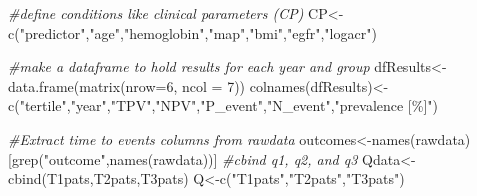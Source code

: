 \documentclass[
]{article}
\newenvironment{Shaded}{\begin{snugshade}}{\end{snugshade}}
\newcommand{\AttributeTok}[1]{\textcolor[rgb]{0.77,0.63,0.00}{#1}}
\newcommand{\CommentTok}[1]{\textcolor[rgb]{0.56,0.35,0.01}{\textit{#1}}}
\newcommand{\DecValTok}[1]{\textcolor[rgb]{0.00,0.00,0.81}{#1}}
\newcommand{\FunctionTok}[1]{\textcolor[rgb]{0.00,0.00,0.00}{#1}}
\newcommand{\NormalTok}[1]{#1}
\newcommand{\OtherTok}[1]{\textcolor[rgb]{0.56,0.35,0.01}{#1}}
\newcommand{\StringTok}[1]{\textcolor[rgb]{0.31,0.60,0.02}{#1}}
\begin{document}
\begin{Shaded}
\begin{Highlighting}[]
\CommentTok{\#define conditions like clinical parameters (CP) }
\NormalTok{CP}\OtherTok{\textless{}{-}}\FunctionTok{c}\NormalTok{(}\StringTok{"predictor"}\NormalTok{,}\StringTok{"age"}\NormalTok{,}\StringTok{"hemoglobin"}\NormalTok{,}\StringTok{"map"}\NormalTok{,}\StringTok{"bmi"}\NormalTok{,}\StringTok{"egfr"}\NormalTok{,}\StringTok{"logacr"}\NormalTok{)}

\CommentTok{\#make a dataframe to hold results for each year and group}
\NormalTok{dfResults}\OtherTok{\textless{}{-}}\FunctionTok{data.frame}\NormalTok{(}\FunctionTok{matrix}\NormalTok{(}\AttributeTok{nrow=}\DecValTok{6}\NormalTok{, }\AttributeTok{ncol =} \DecValTok{7}\NormalTok{))}
\FunctionTok{colnames}\NormalTok{(dfResults)}\OtherTok{\textless{}{-}}\FunctionTok{c}\NormalTok{(}\StringTok{"tertile"}\NormalTok{,}\StringTok{"year"}\NormalTok{,}\StringTok{"TPV"}\NormalTok{,}\StringTok{"NPV"}\NormalTok{,}\StringTok{"P\_event"}\NormalTok{,}\StringTok{"N\_event"}\NormalTok{,}\StringTok{"prevalence [\%]"}\NormalTok{)}


\CommentTok{\#Extract time to events columns from rawdata}
\NormalTok{outcomes}\OtherTok{\textless{}{-}}\FunctionTok{names}\NormalTok{(rawdata)[}\FunctionTok{grep}\NormalTok{(}\StringTok{"outcome"}\NormalTok{,}\FunctionTok{names}\NormalTok{(rawdata))]}
\CommentTok{\#cbind q1, q2, and q3}
\NormalTok{Qdata}\OtherTok{\textless{}{-}}\FunctionTok{cbind}\NormalTok{(T1pats,T2pats,T3pats)}
\NormalTok{Q}\OtherTok{\textless{}{-}}\FunctionTok{c}\NormalTok{(}\StringTok{"T1pats"}\NormalTok{,}\StringTok{"T2pats"}\NormalTok{,}\StringTok{"T3pats"}\NormalTok{)}


\end{Highlighting}
\end{Shaded}
\end{document}
